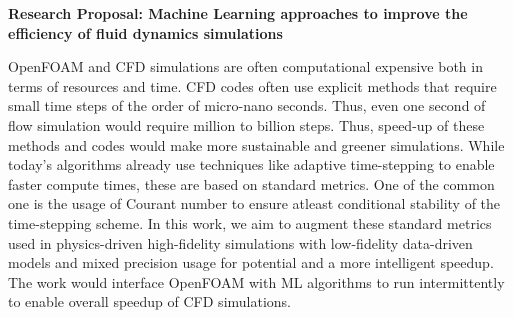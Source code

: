 \documentclass{letter}
\date{\today}
\begin{document}
\begin{letter}
  \hfill

  \textbf{Research Proposal: Machine Learning approaches to improve the efficiency of fluid dynamics simulations}

  OpenFOAM and CFD simulations are often computational expensive both in terms of resources and time. CFD codes often use explicit methods that require small time steps of the order of micro-nano seconds. Thus, even one second of flow simulation would require million to billion steps. Thus, speed-up of these methods and codes would make more sustainable and greener simulations. While today's algorithms already use techniques like adaptive time-stepping to enable faster compute times, these are based on standard metrics. One of the common one is the usage of Courant number to ensure atleast conditional stability of the time-stepping scheme. In this work, we aim to augment these standard metrics used in physics-driven high-fidelity simulations with low-fidelity data-driven models and mixed precision usage for potential and a more intelligent speedup. The work would interface OpenFOAM with ML algorithms to run intermittently to enable overall speedup of CFD simulations.

  \bigskip

\end{letter}
\end{document}

